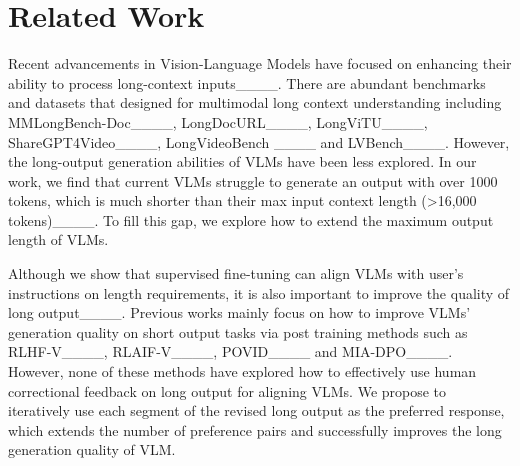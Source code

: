 \section{Related Work}
Recent advancements in Vision-Language Models have focused on enhancing their ability to process long-context inputs____. There are abundant benchmarks and datasets that designed for multimodal long context understanding including MMLongBench-Doc____, LongDocURL____, LongViTU____, ShareGPT4Video____, LongVideoBench ____ and LVBench____. However, the long-output generation abilities of VLMs have been less explored. In our work, we find that current VLMs struggle to generate an output with over 1000 tokens, which is much shorter than their max input context length (>16,000 tokens)____. To fill this gap, we explore how to extend the maximum output length of VLMs.


Although we show that supervised fine-tuning can align VLMs with user's instructions on length requirements, it is also important to improve the quality of long output____. Previous works mainly focus on how to improve VLMs' generation quality on short output tasks via post training methods such as RLHF-V____, RLAIF-V____, POVID____ and MIA-DPO____. However, none of these methods have explored how to effectively use human correctional feedback on long output for aligning VLMs. We propose to iteratively use each segment of the revised long output as the preferred response, which extends the number of preference pairs and successfully improves the long generation quality of VLM.


\begin{table}[t]
\centering
{}
\caption{Scores (\%) on MMLongBench-Write for models trained under different conditions, where $S$, $S_l$ and $S_q$ is the overall, length and quality score on all tasks and $S_{PPT}$ is the overall score on the PPT script task.}
\label{tb:mem}
\end{table}